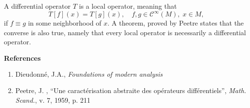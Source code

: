 \documentclass[12pt]{article}
\newcommand{\cfty}{\mathcal{C}^\infty}
\begin{document}
A differential operator $T$ is a local operator, meaning that
$$T[f](x) = T[g](x),\quad f,g\in\cfty(M),\; x\in M,$$
if $f\equiv g$ in some neighborhood of $x$.  A theorem, proved by
Peetre states that the converse is also true, namely that every local
operator is necessarily a differential operator.

\bigskip
{\bf References}

\begin{enumerate}
\item Dieudonn\'e, J.A., {\em Foundations of modern analysis}
\item Peetre, J. , ``Une caract\'erisation abstraite des op\'erateurs
  diff\'erentiels'', {\em Math. Scand.}, v. 7, 1959, p. 211
\end{enumerate}
\end{document}
